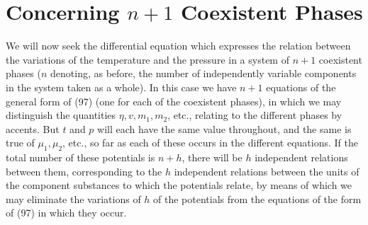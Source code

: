 \documentclass[11pt]{article}
\begin{document}
\section*{Concerning \(n+1\) Coexistent Phases}

We will now seek the differential equation which expresses the relation between the variations of the temperature and the pressure in a system of \(n+1\) coexistent phases (\(n\) denoting, as before, the number of independently variable components in the system taken as a whole). In this case we have \(n+1\) equations of the general form of (97) (one for each of the coexistent phases), in which we may distinguish the quantities \(\eta,v,m_1,m_2\), etc., relating to the different phases by accents. But \(t\) and \(p\) will each have the same value throughout, and the same is true of \(\mu_1,\mu_2\), etc., so far as each of these occurs in the different equations. If the total number of these potentials is \(n+h\), there will be \(h\) independent relations between them, corresponding to the \(h\) independent relations between the units of the component substances to which the potentials relate, by means of which we may eliminate the variations of \(h\) of the potentials from the equations of the form of (97) in which they occur.
\end{document}
